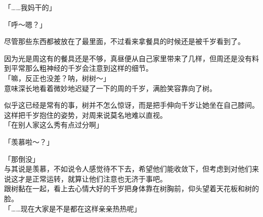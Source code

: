 「……我妈干的」

「呼～嗯？」

尽管那些东西都被放在了最里面，不过看来拿餐具的时候还是被千岁看到了。

因为光是周这有的餐具还是不够，真昼便从自己家里带来了几样，但周还是没有料到平常那么粗神经的千岁会注意到这样的细节。\\

「嘛，反正也没差？呐，树树～」\\

意味深长地看着微妙地迟疑了一下的周的千岁，满脸笑容靠向了树。

似乎这已经是常有的事，树并不怎么惊讶，而是把手伸向千岁让她坐在自己膝间。这样把千岁抱住的姿势，对周来说莫名地难以直视。\\

「在别人家这么秀有点过分啊」

「羡慕啦～？」

「那倒没」\\

与其说是羡慕，不如说令人感觉待不下去，希望他们能收敛下，但考虑到对他们来说这才是正常运转，就算让他们注意也无济于事吧。\\

跟树黏在一起，看上去心情大好的千岁把身体靠在树胸前，仰头望着天花板和树的脸。\\

「……现在大家是不是都在这样亲亲热热呢」

